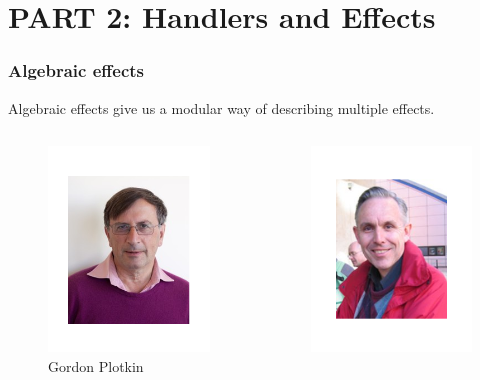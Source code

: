 \section{PART 2: Handlers and Effects}
\begin{frame}
  \frametitle{Algebraic effects}
  Algebraic effects give us a modular way of describing multiple effects.
  \begin{columns}
    \begin{column}{0.5\textwidth}
      \begin{center}
        \begin{figure}
          \includegraphics[scale=0.3]{figures/gordonplotkin.png}
          \caption{Gordon Plotkin}
        \end{figure}
      \end{center}
    \end{column}
    \begin{column}{0.5\textwidth}
      \begin{center}
        \begin{figure}
          \includegraphics[scale=0.3]{figures/johnpower.png}

\end{figure}
\end{center}
\end{column}
\end{columns}
\end{frame}
